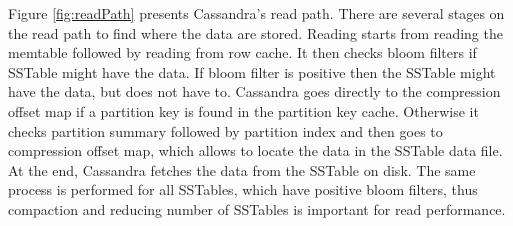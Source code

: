 Figure \ref{fig:readPath} presents Cassandra's read path. There are several stages on the read path to find where the
 data are stored. Reading starts from reading the memtable followed by reading from row cache. It then checks bloom
 filters if SSTable might have the data. If bloom filter is positive then the SSTable might have the data, but does not have to. Cassandra goes directly to the compression offset map if a partition key is found in the partition key cache. Otherwise it checks partition summary followed by partition index and then goes to compression offset map, which allows to locate the data in the SSTable data file. At the end, Cassandra fetches the data from the SSTable on disk. The same process is performed for all SSTables, which have positive bloom filters, thus compaction and reducing number of SSTables is important for read performance.


